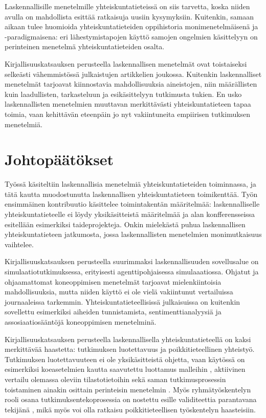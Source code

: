 \documentclass[finnish,gradu,twoside,12pt]{tktltiki}
\begin{document}
{Laskennallisille menetelmille yhteiskuntatieteissä on siis tarvetta, koska niiden avulla on mahdollista esittää ratkaisuja uusiin kysymyksiin. Kuitenkin, samaan aikaan tulee huomioida yhteiskuntatieteiden oppihistoria monimenetelmäisenä ja -paradigmaisena: eri lähestymistapojen käyttö samojen ongelmien käsittelyyn on perinteinen menetelmä yhteiskuntatieteiden osalta.

Kirjallisuuskatsauksen perusteella laskennallisen menetelmät ovat toistaiseksi selkeästi vähemmistössä julkaistujen artikkelien joukossa. Kuitenkin laskennalliset menetelmät tarjoavat kiinnostavia mahdollisuuksia aineistojen, niin määrällisten kuin laadullisten, tarkasteluun ja esikäsittelyyn tutkimusta tukien. En usko laskennallisten menetelmien muuttavan merkittävästi yhteiskuntatieteen tapaa toimia, vaan kehittävän eteenpäin jo nyt vakiintuneita empiirisen tutkimuksen menetelmiä.

\section{Johtopäätökset}

Työssä käsiteltiin laskennallisia menetelmiä yhteiskuntatieteiden toiminnassa, ja tätä kautta muodostunutta laskennallisen yhteiskuntatieteen toimikenttää. Työn ensimmäinen kontribuutio käsittelee toimintakentän määritelmää: laskennalliselle yhteiskuntatieteelle ei löydy yksikäsitteistä määritelmää ja alan konfferensseissa esitellään esimerkiksi taideprojekteja. Onkin mielekästä puhua laskennallisen yhteiskuntatieteen jatkumosta, jossa laskennallisten menetelmien monimutkaisuus vaihtelee.

Kirjallisuuskatsauksen perusteella suurimmaksi laskennallisuuden sovellusalue on simulaatiotutkimuksessa, erityisesti agenttipohjaisessa simulaaatiossa. Ohjatut ja ohjaamattomat koneoppimisen menetelmät tarjoavat mielenkiintoisia mahdollisuuksia, mutta niiden käyttö ei ole vielä vakiintunut vertailuissa journaaleissa tarkemmin. Yhteiskuntatieteellisissä julkaisuissa on kuitenkin sovellettu esimerkiksi aiheiden tunnistamista, sentimenttianalyysiä ja assosiaatiosääntöjä koneoppimisen menetelminä.

Kirjallisuuskatsauksen perusteella laskennallisella yhteiskuntatieteellä on kaksi merkittävää haastetta: tutkimuksen luotettavuus ja poikkitieteellinen yhteistyö. Tutkimuksen luotettavuuteen ei ole yksikäsitteistä ohjetta, vaan käytössä on esimerkiksi koeasetelmien kautta saavutettu luottamus malleihin \citep{Villatoro2013}, aktiivinen vertailu olemassa oleviin tilastotietoihin \citep{Pearson2011} sekä saman tutkimusprosessin toistaminen ainakin osittain perinteisin menetelmin \citep{edmonds2005computational}. Myös ryhmätyöskentelyn rooli osana tutkimuksentekoprosessia on nostettu esille validiteettia parantavana tekijänä \citep{Milne2014}, mikä myös voi olla ratkaisu poikkitieteellisen työskentelyn haasteisiin.

}
\end{document}
